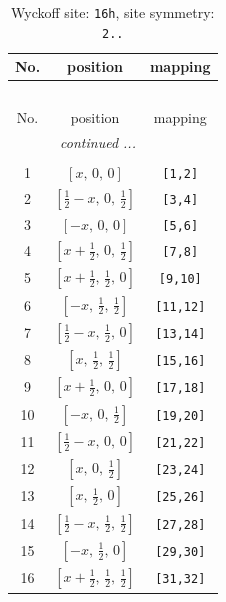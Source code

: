 \documentclass[fleqn,8pt]{jsarticle}
\begin{document}
\renewcommand{\arraystretch}{1.2}
\begin{longtable}{ccc}
\caption{Wyckoff site: {\tt 16h}, site symmetry: {\tt 2..}}
 \\
 \hline \hline
No. & position & mapping \\ \hline \endfirsthead

\multicolumn{2}{l}{\tablename\ \thetable{}} \\
 \hline \hline
No. & position & mapping \\ \hline \endhead

 \hline \hline
\multicolumn{2}{r}{\footnotesize\it continued ...} \\ \endfoot

 \hline \hline
\multicolumn{2}{r}{} \\ \endlastfoot

1 & $\left[ x,\, 0,\, 0 \right]$ & {\tt [1,2]} \\ \hline
2 & $\left[ \frac{1}{2} - x,\, 0,\, \frac{1}{2} \right]$ & {\tt [3,4]} \\ \hline
3 & $\left[ - x,\, 0,\, 0 \right]$ & {\tt [5,6]} \\ \hline
4 & $\left[ x + \frac{1}{2},\, 0,\, \frac{1}{2} \right]$ & {\tt [7,8]} \\ \hline
5 & $\left[ x + \frac{1}{2},\, \frac{1}{2},\, 0 \right]$ & {\tt [9,10]} \\ \hline
6 & $\left[ - x,\, \frac{1}{2},\, \frac{1}{2} \right]$ & {\tt [11,12]} \\ \hline
7 & $\left[ \frac{1}{2} - x,\, \frac{1}{2},\, 0 \right]$ & {\tt [13,14]} \\ \hline
8 & $\left[ x,\, \frac{1}{2},\, \frac{1}{2} \right]$ & {\tt [15,16]} \\ \hline
9 & $\left[ x + \frac{1}{2},\, 0,\, 0 \right]$ & {\tt [17,18]} \\ \hline
10 & $\left[ - x,\, 0,\, \frac{1}{2} \right]$ & {\tt [19,20]} \\ \hline
11 & $\left[ \frac{1}{2} - x,\, 0,\, 0 \right]$ & {\tt [21,22]} \\ \hline
12 & $\left[ x,\, 0,\, \frac{1}{2} \right]$ & {\tt [23,24]} \\ \hline
13 & $\left[ x,\, \frac{1}{2},\, 0 \right]$ & {\tt [25,26]} \\ \hline
14 & $\left[ \frac{1}{2} - x,\, \frac{1}{2},\, \frac{1}{2} \right]$ & {\tt [27,28]} \\ \hline
15 & $\left[ - x,\, \frac{1}{2},\, 0 \right]$ & {\tt [29,30]} \\ \hline
16 & $\left[ x + \frac{1}{2},\, \frac{1}{2},\, \frac{1}{2} \right]$ & {\tt [31,32]} \\
\end{longtable}
\end{document}
